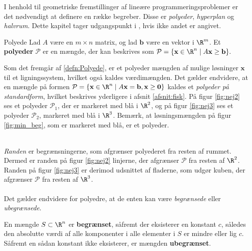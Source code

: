 I henhold til geometriske fremstillinger af lineære programmeringsproblemer er det nødvendigt at definere en række begreber.
Disse er \textit{polyeder}, \textit{hyperplan} og \textit{halvrum}.
Dette kapitel tager udgangspunkt i \citep[side 42-70]{bert}, hvis ikke andet er angivet.
%
\begin{defn}{}{Polyede}
Lad $A$ være en $m \times n$ matrix, og lad $\mathbf{b}$ være en vektor i  $\R^m$.
Et \textbf{polyeder} $\mathcal{P}$ er en mængde, der kan beskrives som 
$\mathcal{P} = \{\textbf{x} \in \R^n \mid A\mathbf{x}\geq \textbf{b}\}.$
%
\end{defn}
\noindent
%
Som det fremgår af \ref{defn:Polyede}, er et polyeder mængden af mulige løsninger $\mathbf{x}$ til et ligningssystem, hvilket også kaldes værdimængden.
Det gælder endvidere, at en mængde på formen $\mathcal{P} = \{\textbf{x} \in \R^n \mid A\textbf{x} = \textbf{b},\textbf{x} \geq \textbf{0} \}$ kaldes et \textit{polyeder på standardform}, hvilket beskrives yderligere i afsnit \ref{afsnit:fisk}.
%
%
På figur \ref{fig:nej2} ses et polyeder $\mathcal{P}_1$, der er markeret med blå i $\R^2$, og på figur \ref{fig:nej3} ses et polyeder $\mathcal{P}_2$, markeret med blå i $\R^3$.
Bemærk, at løsningsmængden på figur \ref{fig:min_beg}, som er markeret med blå, er et polyeder.
%
%
\begin{center}
$
\begin{array}{cc}
&

\end{array}
$
\end{center}
%
\textit{Randen} er begrænsningerne, som afgrænser polyederet fra resten af rummet. 
Dermed er randen på figur \ref{fig:nej2} linjerne, der afgrænser $\mathcal{P}$ fra resten af $\R^2$.
Randen på figur \ref{fig:nej3} er derimod udsnittet af fladerne, som udgør kuben, der afgrænser $\mathcal{P}$ fra resten af $\R^3$.
\\\\
%
Det gælder endvidere for polyedre, at de enten kan være \textit{begrænsede} eller \textit{ubegrænsede}.
%
\begin{defn}{}{}
En mængde $S \subset \R^n$ er \textbf{begrænset}, såfremt der eksisterer en konstant $c$, således den absolutte værdi af alle komponenter i alle elementer i $S$ er mindre eller lig $c$. 
Såfremt en sådan konstant ikke eksisterer, er mængden \textbf{ubegrænset}.
\end{defn}
\noindent
